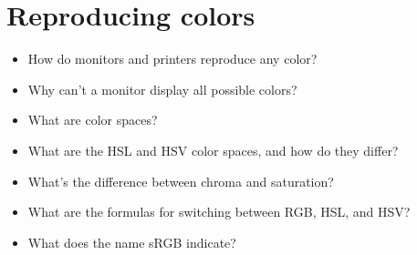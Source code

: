 \documentclass[
]{article}
\providecommand{\tightlist}{%
  \setlength{\itemsep}{0pt}\setlength{\parskip}{0pt}}
\begin{document}
\hypertarget{reproducing-colors}{%
\section{Reproducing colors}\label{reproducing-colors}}

\begin{itemize}
\tightlist
\item
  How do monitors and printers reproduce any color?
\item
  Why can't a monitor display all possible colors?
\item
  What are color spaces?
\item
  What are the HSL and HSV color spaces, and how do they differ?
\item
  What's the difference between chroma and saturation?
\item
  What are the formulas for switching between RGB, HSL, and HSV?
\item
  What does the name sRGB indicate?
\end{itemize}
\end{document}
